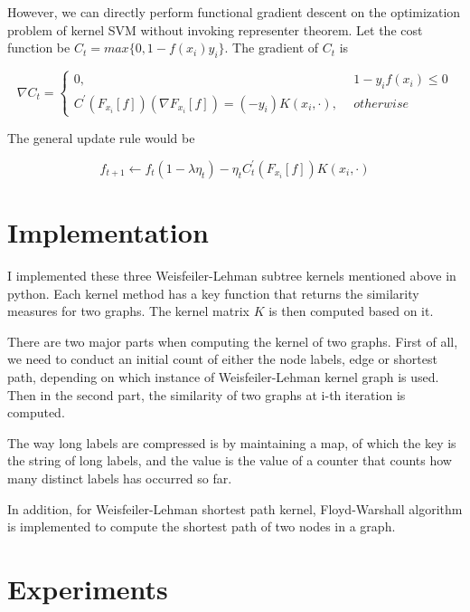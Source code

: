 \documentclass{llncs}
\begin{document}
However, we can directly perform functional gradient descent on the optimization problem of kernel SVM without invoking representer theorem. Let the cost function be $C_t = max\{0, 1 - f(x_i)y_i \}$. The gradient of $C_t$ is  

\begin{equation}
\nabla C_t = \left\{
                \begin{array}{ll}
                  0,  &1 - y_if(x_i) \leq 0 \\
                  C^{\prime}(F_{x_i}[f])(\nabla F_{x_i}[f]) = (-y_i)K(x_i, \cdot), \ \  & otherwise
                \end{array}
              \right.
\end{equation}

The general update rule would be 

\begin{equation}
f_{t+1} \leftarrow f_t(1 - \lambda \eta_t) - \eta_t C_t^{\prime}(F_{x_i}[f])K(x_i, \cdot)
\end{equation}

%
\section{Implementation}
%

I implemented these three Weisfeiler-Lehman subtree kernels mentioned above in python. Each kernel method has a key function that returns the similarity measures for two graphs. The kernel matrix $K$ is then computed based on it.  

There are two major parts when computing the kernel of two graphs. First of all, we need to conduct an initial count of either the node labels, edge or shortest path, depending on which instance of Weisfeiler-Lehman kernel graph is used. Then in the second part, the similarity of two graphs at i-th iteration is computed.   

The way long labels are compressed is by maintaining a map, of which the key is the string of long labels, and the value is the value of a counter that counts how many distinct labels has occurred so far.   

In addition, for Weisfeiler-Lehman shortest path kernel, Floyd-Warshall algorithm is implemented to compute the shortest path of two nodes in a graph.  

%
\section{Experiments}
%
\end{document}
